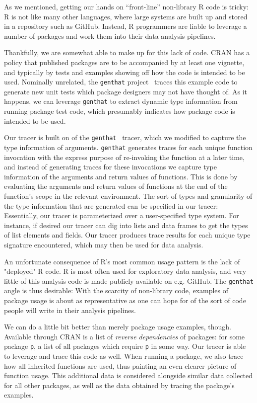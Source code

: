 \documentclass[acmsmall,10pt,review,anonymous]{acmart}\settopmatter{printfolios=true,printccs=false,printacmref=false}
\begin{document}
As we mentioned, getting our hands on ``front-line'' non-library R code is tricky: 
R is not like many other languages, where large systems are built up and stored in a repository such as GitHub.  
Instead, R programmers are liable to leverage a number of packages and work them into their data analysis pipelines.

Thankfully, we are somewhat able to make up for this lack of code.
CRAN has a policy that published packages are to be accompanied by at least one vignette, and typically by tests and examples showing off how the code is intended to be used.  
Nominally unrelated, the {\tt genthat} project~\cite{issta18} traces this example code to generate new unit tests which package designers may not have thought of.
As it happens, we can leverage {\tt genthat} to extract dynamic type information from running package test code, which presumably indicates how package code is intended to be used.


Our tracer is built on of the {\tt genthat}~\cite{issta18} tracer, which we modified to capture the type information of arguments.  
{\tt genthat} generates traces for each unique function invocation with the express purpose of re-invoking the function at a later time, and instead of generating traces for these invocations we capture type information of the arguments and return values of functions.
This is done by evaluating the arguments and return values of functions at the end of the function's scope in the relevant environment.  
The sort of types and granularity of the type information that are generated can be specified in our tracer: 
Essentially, our tracer is parameterized over a user-specified type system.  
For instance, if desired our tracer can dig into lists and data frames to get the types of list elements and fields.
Our tracer produces trace results for each unique type signature encountered, which may then be used for data analysis.

An unfortunate consequence of R's most common usage pattern is the lack of "deployed" R code. 
R is most often used for exploratory data analysis, and very little of this analysis code is made publicly available on e.g. GitHub.
The {\tt genthat} angle is thus desirable: 
With the scarcity of non-library code, examples of package usage is about as representative as one can hope for of the sort of code people will write in their analysis pipelines.

We can do a little bit better than merely package usage examples, though.
Available through CRAN is a list of {\it reverse dependencies} of packages: 
for some package {\tt p}, a list of all packages which require {\tt p} in some way.  
Our tracer is able to leverage and trace this code as well. 
When running a package, we also trace how all inherited functions are used, thus painting an even clearer picture of function usage.  
This additional data is considered alongside similar data collected for all other packages, as well as the data obtained by tracing the package's examples.
\end{document}
